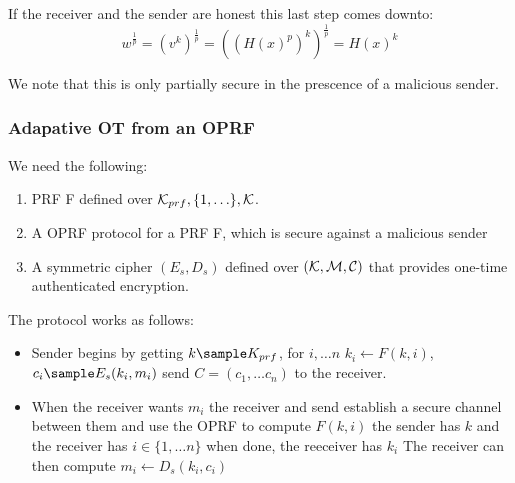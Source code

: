 If the receiver and the sender are honest this last step comes downto: 
\[
     w^{\frac{1}{p}} = (v^k)^{\frac{1}{p}} = ((H(x)^p)^k)^{\frac{1}{p}} = H(x)^k
\]

We note that this is only partially secure in the prescence of a malicious sender. 

\subsubsection{Adapative OT from an OPRF}

We need the following: 
\begin{enumerate}
    \item PRF F defined over \(\mathcal{K}_{prf}, \{1,\ldots \}, \mathcal{K} \). 
    \item A OPRF protocol for a PRF F, which is secure against a malicious sender
    \item A symmetric cipher \((E_s, D_s)\) defined over \((\mathcal{K}, \mathcal{M}, \mathcal{C})\) that provides one-time authenticated encryption. 
\end{enumerate}

The protocol works as follows: 

\begin{itemize}
    \item Sender begins by getting \(k \sample K_{prf}\), for \(i, \ldots n \) \(k_i \gets F(k,i)\), \(c_i \sample E_s(k_i, m_i)\) send \( C= (c_1 , \ldots c_n ) \) to the receiver. 
    \item When the receiver wants \(m_i\) the receiver and send establish a secure channel between them and use the OPRF to compute \(F(k, i)\) the sender has \(k\) and the receiver has \(i \in \{1, \ldots n\} \) when done, the reeceiver has \(k_i\)
    The receiver can then compute \(m_i \gets D_s(k_i, c_i)\)           
\end{itemize}
